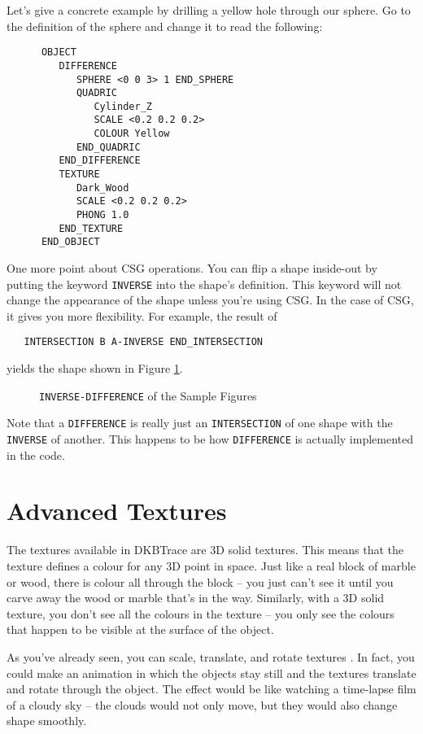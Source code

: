 Let's give a concrete example by drilling a yellow hole through our sphere.
Go to the definition of the sphere and change it to read the following:
\begin{verbatim}
      OBJECT
         DIFFERENCE
            SPHERE <0 0 3> 1 END_SPHERE
            QUADRIC
               Cylinder_Z
               SCALE <0.2 0.2 0.2>
               COLOUR Yellow
            END_QUADRIC
         END_DIFFERENCE
         TEXTURE
            Dark_Wood
            SCALE <0.2 0.2 0.2>
            PHONG 1.0
         END_TEXTURE
      END_OBJECT
\end{verbatim}

One more point about CSG operations.  You can flip a shape inside-out
by putting the keyword {\tt INVERSE} into the
shape's definition.
This keyword will not change the appearance of the shape unless you're
using CSG.  In the case of CSG, it gives you more flexibility.  For
example, the result of
\begin{verbatim}
   INTERSECTION B A-INVERSE END_INTERSECTION
\end{verbatim}
yields the shape shown in Figure \ref{csg4}.
\begin{figure}[htbp]
\begin{centering}

\caption{{\tt INVERSE-DIFFERENCE} of the Sample Figures}
\label{csg4}
\end{centering}
\end{figure}
Note that a {\tt DIFFERENCE} is really just an {\tt INTERSECTION} of
one shape with the {\tt INVERSE} of another.  This happens to be how
{\tt DIFFERENCE} is actually implemented in the code.

\section{Advanced Textures}

The textures available in DKBTrace are 3D solid textures.  This means that the
texture defines a colour for any 3D point in space.  Just like a real block of
marble or wood, there is colour all through the block -- you just can't see it
until you carve away the wood or marble that's in the way.  Similarly, with a
3D solid texture, you don't see all the colours in the texture -- you only see
the colours that happen to be visible at the surface of the object.

As you've already seen, you can scale, translate, and rotate
textures%
.
In fact, you could make an animation in which the objects stay still and the
textures translate and rotate through the object.  The effect would be like
watching a time-lapse film of a cloudy sky -- the clouds would not only move,
but they would also change shape smoothly.

